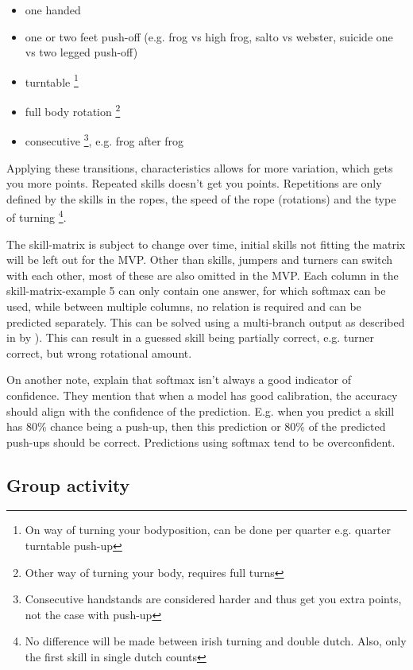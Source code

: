 \begin{itemize}
    \item one handed
    \item one or two feet push-off (e.g. frog vs high frog, salto vs webster, suicide one vs two legged push-off)
    \item turntable \footnote{On way of turning your bodyposition, can be done per quarter e.g. quarter turntable push-up}
    \item full body rotation \footnote{Other way of turning your body, requires full turns}
    \item consecutive \footnote{Consecutive handstands are considered harder and thus get you extra points, not the case with push-up}, e.g. frog after frog
\end{itemize}

Applying these transitions, characteristics allows for more variation, which gets you more points. Repeated skills doesn't get you points. Repetitions are only defined by the skills in the ropes, the speed of the rope (rotations) and the type of turning \footnote{No difference will be made between irish turning and double dutch. Also, only the first skill in single dutch counts}.

\medskip

The skill-matrix is subject to change over time, initial skills not fitting the matrix will be left out for the MVP. Other than skills, jumpers and turners can switch with each other, most of these are also omitted in the MVP.
Each column in the skill-matrix-example 5 can only contain one answer, for which softmax can be used, while between multiple columns, no relation is required and can be predicted separately. This can be solved using a multi-branch output as described in by \autocite{Coulibaly_2022}). This can result in a guessed skill being partially correct, e.g. turner correct, but wrong rotational amount.

On another note, \textcite{Guo_2017} explain that softmax isn't always a good indicator of confidence. They mention that when a model has good calibration, the accuracy should align with the confidence of the prediction. E.g. when you predict a skill has 80\% chance being a push-up, then this prediction or 80\% of the predicted push-ups should be correct. Predictions using softmax tend to be overconfident.

\subsection{Group activity}

